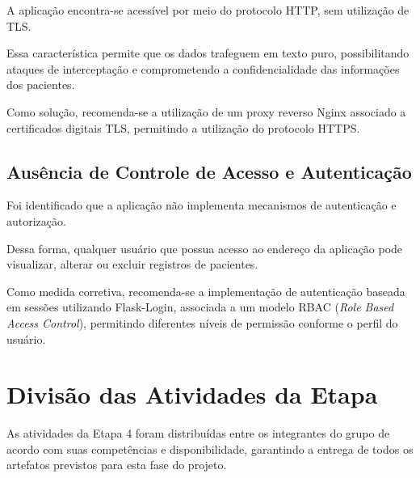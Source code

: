 \documentclass[12pt,a4paper,oneside]{report}
\begin{document}
A aplicação encontra-se acessível por meio do protocolo HTTP, sem utilização de TLS.

Essa característica permite que os dados trafeguem em texto puro, possibilitando ataques de interceptação e comprometendo a confidencialidade das informações dos pacientes.

Como solução, recomenda-se a utilização de um proxy reverso Nginx associado a certificados digitais TLS, permitindo a utilização do protocolo HTTPS.

\subsection{Ausência de Controle de Acesso e Autenticação}

Foi identificado que a aplicação não implementa mecanismos de autenticação e autorização.

Dessa forma, qualquer usuário que possua acesso ao endereço da aplicação pode visualizar, alterar ou excluir registros de pacientes.

Como medida corretiva, recomenda-se a implementação de autenticação baseada em sessões utilizando Flask-Login, associada a um modelo RBAC (\textit{Role Based Access Control}), permitindo diferentes níveis de permissão conforme o perfil do usuário.

\section{Divisão das Atividades da Etapa}

As atividades da Etapa 4 foram distribuídas entre os integrantes do grupo de acordo com suas competências e disponibilidade, garantindo a entrega de todos os artefatos previstos para esta fase do projeto.
\end{document}
